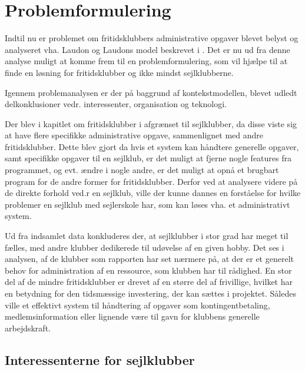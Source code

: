 \chapter{Problemformulering}\label{chap:problemformulering}

Indtil nu er problemet om fritidsklubbers administrative opgaver blevet belyst og analyseret vha. Laudon og Laudons model beskrevet i . Det er nu ud fra denne analyse muligt at komme frem til en problemformulering, som vil hjælpe til at finde en løsning for fritidsklubber og ikke mindst sejlklubberne.

\cbstart
\cbdelete
Igennem problemanalysen er der på baggrund af kontekstmodellen, blevet udledt delkonklusioner vedr. interessenter, organisation og teknologi.
\cbdelete
\cbend

\cbstart
Der blev i kapitlet om fritidsklubber i  afgrænset til sejlklubber, da disse viste sig at have flere specifikke administrative opgave, sammenlignet med andre fritidsklubber. Dette blev gjort da hvis et system kan håndtere generelle opgaver, samt specifikke opgaver til en sejlklub, er det muligt at fjerne nogle features fra programmet, og evt. ændre i nogle andre, er det muligt at opnå et brugbart program for de andre former for fritidsklubber. Derfor ved at analysere videre på de direkte forhold ved.r en sejlklub, ville der kunne dannes en forståelse for hvilke problemer en sejlklub med sejlerskole har, som kan løses vha. et administrativt system. 
\cbend

\cbstart
\cbdelete
Ud fra indsamlet data konkluderes der, at sejlklubber i stor grad har meget til fælles, med andre klubber dedikerede til udøvelse af en given hobby. Det ses i analysen, af de klubber som rapporten har set nærmere på, at der er et generelt behov for administration af en ressource, som klubben har til rådighed. En stor del af de mindre fritidsklubber er drevet af en større del af frivillige, hvilket har en betydning for den tidsmæssige investering, der kan sættes i projektet. Således ville et effektivt system til håndtering af opgaver som kontingentbetaling, medlemsinformation eller lignende være til gavn for klubbens generelle arbejdskraft.
\cbdelete
\cbend

\cbstart
\section{Interessenterne for sejlklubber}
\cbend

